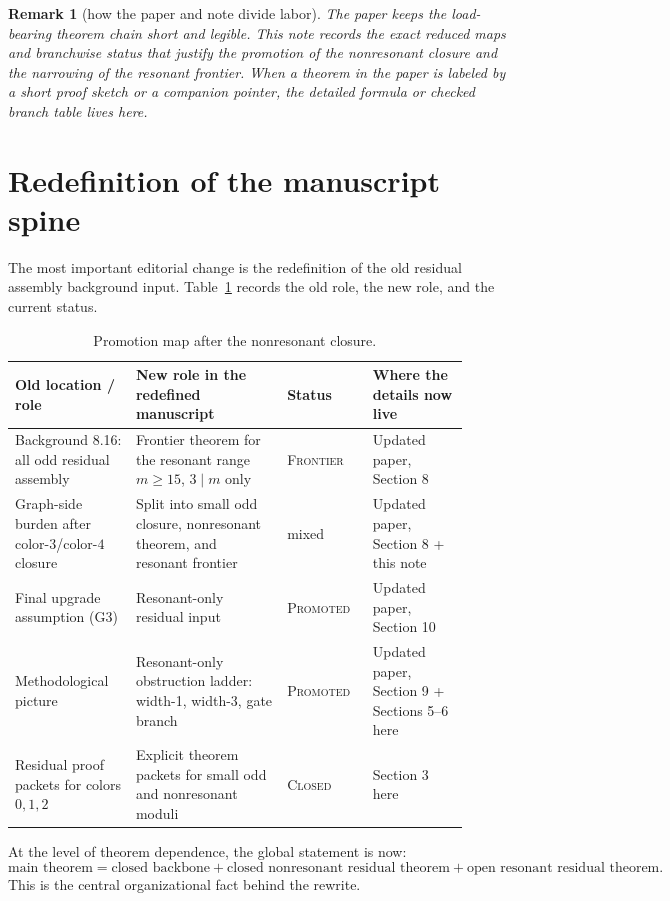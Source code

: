 \documentclass[11pt]{article}
\newtheorem{remark}[theorem]{Remark}
\newcommand{\status}[1]{\textsc{#1}}
\begin{document}
\begin{remark}[how the paper and note divide labor]
The paper keeps the load-bearing theorem chain short and legible.
This note records the exact reduced maps and branchwise status that justify the
promotion of the nonresonant closure and the narrowing of the resonant
frontier.
When a theorem in the paper is labeled by a short proof sketch or a companion
pointer, the detailed formula or checked branch table lives here.
\end{remark}

\section{Redefinition of the manuscript spine}

The most important editorial change is the redefinition of the old residual
assembly background input.
Table~\ref{tab:promotion-map} records the old role, the new role, and the
current status.

\begin{table}[h!]
\centering
\small
\begin{tabular}{p{0.24\linewidth}p{0.30\linewidth}p{0.17\linewidth}p{0.19\linewidth}}
\toprule
Old location / role & New role in the redefined manuscript & Status & Where the details now live \\
\midrule
Background 8.16: all odd residual assembly & Frontier theorem for the resonant range $m\ge 15$, $3\mid m$ only & \status{Frontier} & Updated paper, Section 8 \\
Graph-side burden after color-$3$/color-$4$ closure & Split into small odd closure, nonresonant theorem, and resonant frontier & mixed & Updated paper, Section 8 + this note \\
Final upgrade assumption (G3) & Resonant-only residual input & \status{Promoted} & Updated paper, Section 10 \\
Methodological picture & Resonant-only obstruction ladder: width-1, width-3, gate branch & \status{Promoted} & Updated paper, Section 9 + Sections 5--6 here \\
Residual proof packets for colors $0,1,2$ & Explicit theorem packets for small odd and nonresonant moduli & \status{Closed} & Section 3 here \\
\bottomrule
\end{tabular}
\caption{Promotion map after the nonresonant closure.}
\label{tab:promotion-map}
\end{table}

At the level of theorem dependence, the global statement is now:
\[
\text{main theorem}
=
\text{closed backbone}
+
\text{closed nonresonant residual theorem}
+
\text{open resonant residual theorem}.
\]
This is the central organizational fact behind the rewrite.
\end{document}
